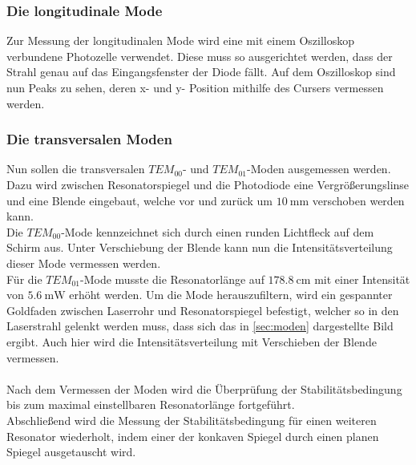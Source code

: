 \subsubsection{Die longitudinale Mode}

    Zur Messung der longitudinalen Mode wird eine mit einem Oszilloskop verbundene Photozelle verwendet.
    Diese muss so ausgerichtet werden,
    dass der Strahl genau auf das Eingangsfenster der Diode fällt.
    Auf dem Oszilloskop sind nun Peaks zu sehen,
    deren x- und y- Position mithilfe des Cursers vermessen werden.

\subsubsection{Die transversalen Moden}

    Nun sollen die transversalen $TEM_{00}$- und $TEM_{01}$-Moden ausgemessen werden.
    Dazu wird zwischen Resonatorspiegel und die Photodiode eine Vergrößerungslinse und eine Blende eingebaut,
    welche vor und zurück um $\SI{10}{\milli\meter}$ verschoben werden kann.\\
    Die $TEM_{00}$-Mode kennzeichnet sich durch einen runden Lichtfleck auf dem Schirm aus.
    Unter Verschiebung der Blende kann nun die Intensitätsverteilung dieser Mode vermessen werden.\\
    Für die $TEM_{01}$-Mode musste die Resonatorlänge auf $\SI{178.8}{\centi\meter}$ mit einer Intensität von $\SI{5.6}{\milli\watt}$ erhöht werden.
    Um die Mode herauszufiltern,
    wird ein gespannter Goldfaden zwischen Laserrohr und Resonatorspiegel befestigt,
    welcher so in den Laserstrahl gelenkt werden muss,
    dass sich das in \autoref{sec:moden} dargestellte Bild ergibt.
    Auch hier wird die Intensitätsverteilung mit Verschieben der Blende vermessen.\\
    \\
    Nach dem Vermessen der Moden wird die Überprüfung der Stabilitätsbedingung bis zum maximal einstellbaren Resonatorlänge fortgeführt.\\
    Abschließend wird die Messung der Stabilitätsbedingung für einen weiteren Resonator wiederholt,
    indem einer der konkaven Spiegel durch einen planen Spiegel ausgetauscht wird.
